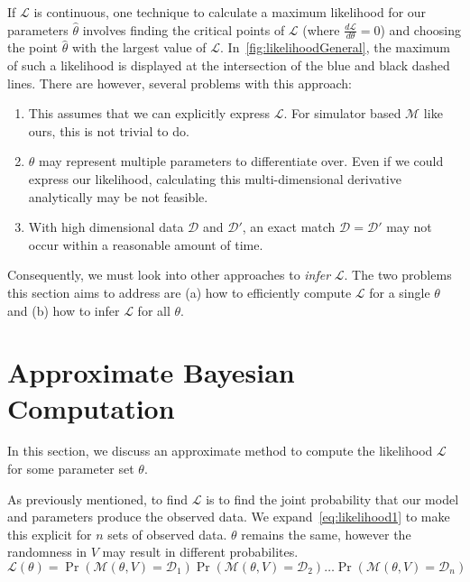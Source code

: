 If $\mathcal{L}$ is continuous, one technique to calculate a maximum likelihood for our parameters $\hat{\theta}$
involves finding the critical points of $\mathcal{L}$ (where $\frac{d\mathcal{L}}{d\theta} = 0$) and choosing the point
$\hat{\theta}$ with the largest value of $\mathcal{L}$.
In~\autoref{fig:likelihoodGeneral}, the maximum of such a likelihood is displayed at the intersection of the blue and
black dashed lines.
There are however, several problems with this approach:
\begin{enumerate}
    \item This assumes that we can explicitly express $\mathcal{L}$.
        For simulator based $\mathcal{M}$ like ours, this is not trivial to do.
    \item $\theta$ may represent multiple parameters to differentiate over.
        Even if we could express our likelihood, calculating this multi-dimensional derivative analytically may be
        not feasible.
    \item With high dimensional data $\mathcal{D}$ and $\mathcal{D}'$, an exact match
        $\mathcal{D} = \mathcal{D}'$ may not occur within a reasonable amount of time.
\end{enumerate}
Consequently, we must look into other approaches to \textit{infer} $\mathcal{L}$.
The two problems this section aims to address are (a) how to efficiently compute $\mathcal{L}$ for a single $\theta$
and (b) how to infer $\mathcal{L}$ for all $\theta$.

\section{Approximate Bayesian Computation}\label{sec:approximateBayesianComputation}
In this section, we discuss an approximate method to compute the likelihood $\mathcal{L}$ for some parameter set
$\theta$.

As previously mentioned, to find $\mathcal{L}$ is to find the joint probability that our model and parameters produce
the observed data.
We expand~\autoref{eq:likelihood1} to make this explicit for $n$ sets of observed data.
$\theta$ remains the same, however the randomness in $V$ may result in different probabilites.
\begin{equation}
    \mathcal{L}(\theta) = \Pr\left(\mathcal{M}(\theta, V) = \mathcal{D}_1 \right)
    \Pr\left(\mathcal{M}(\theta, V) = \mathcal{D}_2 \right) \ldots
    \Pr\left(\mathcal{M}(\theta, V) = \mathcal{D}_n \right)
\end{equation}

